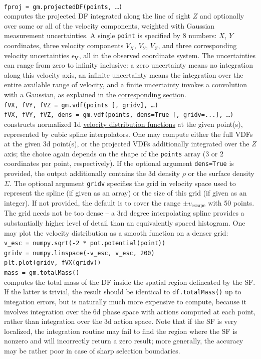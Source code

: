\documentclass[12pt]{article}
\newcommand{\bV}{\boldsymbol{V}}
\begin{document}
\\[2mm]
\texttt{fproj = gm.projectedDF(points, \dots)}\\
computes the projected DF integrated along the line of sight $Z$ and optionally over some or all of the velocity components, weighted with Gaussian measurement uncertainties. A single \texttt{point} is specified by 8 numbers: $X$, $Y$ coordinates, three velocity components $V_X,\,V_Y,\,V_Z$, and three corresponding velocity uncertainties $\epsilon_{\bV}$, all in the observed coordinate system. The uncertainties can range from zero to infinity inclusive: a zero uncertainty means no integration along this velocity axis, an infinite uncertainty means the integration over the entire available range of velocity, and a finite uncertainty invokes a convolution with a Gaussian, as explained in the \hyperref[sec:ProjectedDF]{corresponding section}.\\[2mm]
\texttt{fVX, fVY, fVZ = gm.vdf(points [, gridv], \dots)}\\
\texttt{fVX, fVY, fVZ, dens = gm.vdf(points, dens=True [, gridv=...], \dots)}\\
constructs normalized 1d \hyperref[sec:VDF]{velocity distribution functions} at the given point(s), represented by cubic spline interpolators. One may compute either the full VDFs at the given 3d point(s), or the projected VDFs additionally integrated over the $Z$ axis; the choice again depends on the shape of the \texttt{points} array (3 or 2 coordinates per point, respectively). If the optional argument \texttt{dens=True} is provided, the output additionally contains the 3d density $\rho$ or the surface density $\Sigma$.
The optional argument \texttt{gridv} specifies the grid in velocity space used to represent the spline (if given as an array) or the size of this grid (if given as an integer). If not provided, the default is to cover the range $\pm v_\mathrm{escape}$ with 50 points. The grid needs not be too dense -- a 3rd degree interpolating spline provides a substantially higher level of detail than an equivalently spaced histogram.
One may plot the velocity distribution as a smooth function on a denser grid:\\[1mm]
\texttt{v_esc = numpy.sqrt(-2 * pot.potential(point))\\
gridv = numpy.linspace(-v_esc, v_esc, 200)\\
plt.plot(gridv, fVX(gridv))} \\[2mm]
\texttt{mass = gm.totalMass()}\\
computes the total mass of the DF inside the spatial region delineated by the SF. If the latter is trivial, the result should be identical to \texttt{df.totalMass()} up to integation errors, but is naturally much more expensive to compute, because it involves integration over the 6d phase space with actions computed at each point, rather than integration over the 3d action space. Note that if the SF is very localized, the integration routine may fail to find the region where the SF is nonzero and will incorrectly return a zero result; more generally, the accuracy may be rather poor in case of sharp selection boundaries.\\[2mm]
\end{document}
